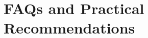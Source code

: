 \documentclass[11pt]{gappyarticle}
\begin{document}
%
%
 
 \section{FAQs and Practical Recommendations}
\end{document}

